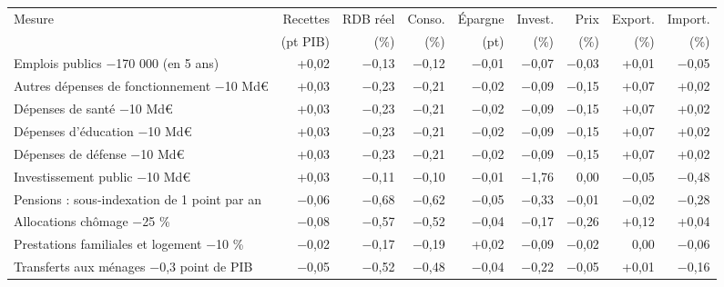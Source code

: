 \begin{tabular}{p{5.0cm}rrrrrrrr}
\toprule
Mesure & Recettes & RDB réel & Conso. & Épargne & Invest. & Prix & Export. & Import. \\
 & (pt PIB) & (\%) & (\%) & (pt) & (\%) & (\%) & (\%) & (\%) \\
\midrule
Emplois publics −170 000 (en 5 ans) & +0{,}02 & $-$0{,}13 & $-$0{,}12 & $-$0{,}01 & $-$0{,}07 & $-$0{,}03 & +0{,}01 & $-$0{,}05 \\
Autres dépenses de fonctionnement −10 Md€ & +0{,}03 & $-$0{,}23 & $-$0{,}21 & $-$0{,}02 & $-$0{,}09 & $-$0{,}15 & +0{,}07 & +0{,}02 \\
Dépenses de santé −10 Md€ & +0{,}03 & $-$0{,}23 & $-$0{,}21 & $-$0{,}02 & $-$0{,}09 & $-$0{,}15 & +0{,}07 & +0{,}02 \\
Dépenses d'éducation −10 Md€ & +0{,}03 & $-$0{,}23 & $-$0{,}21 & $-$0{,}02 & $-$0{,}09 & $-$0{,}15 & +0{,}07 & +0{,}02 \\
Dépenses de défense −10 Md€ & +0{,}03 & $-$0{,}23 & $-$0{,}21 & $-$0{,}02 & $-$0{,}09 & $-$0{,}15 & +0{,}07 & +0{,}02 \\
Investissement public −10 Md€ & +0{,}03 & $-$0{,}11 & $-$0{,}10 & $-$0{,}01 & $-$1{,}76 & 0{,}00 & $-$0{,}05 & $-$0{,}48 \\
Pensions : sous-indexation de 1 point par an & $-$0{,}06 & $-$0{,}68 & $-$0{,}62 & $-$0{,}05 & $-$0{,}33 & $-$0{,}01 & $-$0{,}02 & $-$0{,}28 \\
Allocations chômage −25 \% & $-$0{,}08 & $-$0{,}57 & $-$0{,}52 & $-$0{,}04 & $-$0{,}17 & $-$0{,}26 & +0{,}12 & +0{,}04 \\
Prestations familiales et logement −10 \% & $-$0{,}02 & $-$0{,}17 & $-$0{,}19 & +0{,}02 & $-$0{,}09 & $-$0{,}02 & 0{,}00 & $-$0{,}06 \\
Transferts aux ménages −0,3 point de PIB & $-$0{,}05 & $-$0{,}52 & $-$0{,}48 & $-$0{,}04 & $-$0{,}22 & $-$0{,}05 & +0{,}01 & $-$0{,}16 \\
\bottomrule
\end{tabular}
